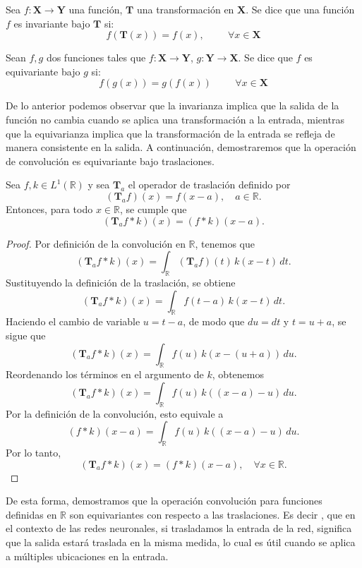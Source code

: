 \begin{definition}[Invarianza]
    Sea $f: \mathbf{X} \longrightarrow \mathbf{Y}$ una función, $\mathbf{T}$ una transformación en $\mathbf{X}$. Se dice que una función $f$ es invariante bajo $\mathbf{T}$ si:
    \[
        f\left(\mathbf{T}(x)\right) = f(x) , \hspace{1cm} \forall x \in \mathbf{X}
    \]
\end{definition}

\begin{definition}[Equivarianza]
    Sean $f,g$ dos funciones tales que $f: \mathbf{X} \longrightarrow \mathbf{Y}$, $g : \mathbf{Y} \longrightarrow \mathbf{X}$. Se dice que $f$ es equivariante bajo $g$ si:
    \[
        f\left( g(x)\right) = g\left(f(x)\right) \hspace{1cm} \forall x \in \mathbf{X}
    \]

\end{definition}
De lo anterior podemos observar que la invarianza implica que la salida de la función no cambia cuando se aplica una transformación a la entrada, mientras que la equivarianza implica que la transformación de la entrada se refleja de manera consistente en la salida.
A continuación, demostraremos que la operación de convolución es equivariante bajo traslaciones.

\begin{teorema}

    Sea $f, k \in L^1(\mathbb{R})$ y sea $\mathbf{T}_a$ el operador de traslación definido por
    \[
        (\mathbf{T}_a f)(x) = f(x - a), \quad a \in \mathbb{R}.
    \]
    Entonces, para todo $x \in \mathbb{R}$, se cumple que
    \[
        (\mathbf{T}_a f \ast k)(x) = (f \ast k)(x - a).
    \]
\end{teorema}

\begin{proof}
    Por definición de la convolución en $\mathbb{R}$, tenemos que
    \[
        (\mathbf{T}_a f \ast k)(x) = \int_{\mathbb{R}} (\mathbf{T}_a f)(t)\, k(x - t)\,
        dt.
    \]
    Sustituyendo la definición de la traslación, se obtiene
    \[
        (\mathbf{T}_a f \ast k)(x) = \int_{\mathbb{R}} f(t - a)\, k(x - t)\, dt.
    \]
    Haciendo el cambio de variable $u = t - a$, de modo que $du = dt$ y $t = u + a$, se sigue que
    \[
        (\mathbf{T}_a f \ast k)(x) = \int_{\mathbb{R}} f(u)\, k(x - (u + a))\, du.
    \]
    Reordenando los términos en el argumento de $k$, obtenemos
    \[
        (\mathbf{T}_a f \ast k)(x) = \int_{\mathbb{R}} f(u)\, k((x - a) - u)\, du.
    \]
    Por la definición de la convolución, esto equivale a
    \[
        (f \ast k)(x - a) = \int_{\mathbb{R}} f(u)\, k((x - a) - u)\, du.
    \]
    Por lo tanto,
    \[
        (\mathbf{T}_a f \ast k)(x) = (f \ast k)(x - a), \quad \forall x \in \mathbb{R}.
    \]
\end{proof}
De esta forma, demostramos que la operación convolución para funciones definidas en $\mathbb{R}$ son equivariantes con respecto a las traslaciones.
Es decir , que en el contexto de las redes neuronales, si trasladamos la entrada de la red, significa que la salida estará traslada en la misma medida, lo cual es útil cuando se aplica a múltiples ubicaciones en la entrada.


